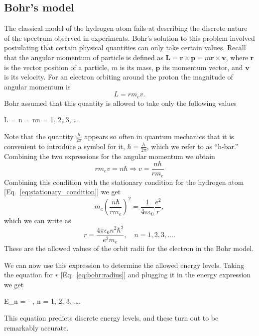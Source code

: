 \subsection{Bohr's model}
The classical model of the hydrogen atom fails at describing the discrete nature of the spectrum observed in experiments.
Bohr's solution to this problem involved postulating that certain physical quantities can only take certain values.
Recall that the angular momentum of particle is defined as $\mathbf{L} = \mathbf{r} \times \mathbf{p} = m \mathbf{r} \times \mathbf{v}$, where $\mathbf{r}$ is the vector position of a particle, $m$ is its mass, $\mathbf{p}$ its momentum vector, and $\mathbf{v}$ is its velocity.
For an electron orbiting around the proton the magnitude of angular momentum is
\begin{equation}
L = r m_e v.
\end{equation}
Bohr assumed that this quantity is allowed to take only the following values
\begin{iequation}
L = n  = n\hbar \quad n = 1, 2, 3, \ldots.
\end{iequation}
Note that the quantity $\frac{h}{2\pi}$ appears so often in quantum mechanics that it is convenient to introduce a symbol for it, $\hbar = \frac{h}{2\pi}$, which we refer to as ``h-bar.''
Combining the two expressions for the angular momentum we obtain
\begin{equation}
r m_e v = n\hbar \Rightarrow v = \frac{n\hbar}{r m_e}
\end{equation}
Combining this condition with the stationary condition for the hydrogen atom [Eq.~\eqref{eq:stationary_condition}] we get
\begin{equation}
m_e \left(\frac{n\hbar}{r m_e}\right)^2 = \frac{1}{4 \pi \epsilon_0} \frac{e^2}{r},
\end{equation}
which we can write as
\begin{equation}
\label{eq:bohr:radius}
r = \frac{4 \pi \epsilon_0 n^2\hbar^2}{e^2 m_e}, \quad n = 1, 2, 3, \ldots .
\end{equation}
These are the allowed values of the orbit radii for the electron in the Bohr model.

We can now use this expression to determine the allowed energy levels.
Taking the equation for $r$ [Eq.~\eqref{eq:bohr:radius}] and plugging it in the energy expression we get
\begin{iequation}
E_n = - , \quad n = 1, 2, 3, \ldots .
\end{iequation}
This equation predicts discrete energy levels, and these turn out to be remarkably accurate.

